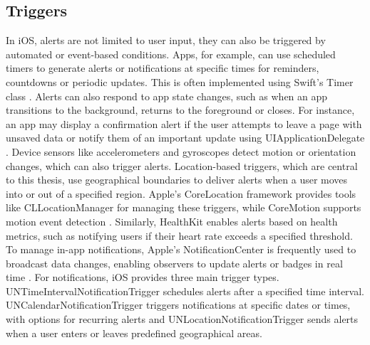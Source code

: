 \subsection{Triggers}
In iOS, alerts are not limited to user input, they can also be triggered by automated or event-based conditions. 
Apps, for example, can use scheduled timers to generate alerts or notifications at specific times for reminders, countdowns or periodic updates. 
This is often implemented using Swift's Timer class \cite{apple_timer}.
Alerts can also respond to app state changes, such as when an app transitions to the background, returns to the foreground or closes. 
For instance, an app may display a confirmation alert if the user attempts to leave a page with unsaved data or notify them of an important update using UIApplicationDelegate \cite{apple_app_delegate}.
Device sensors like accelerometers and gyroscopes detect motion or orientation changes, which can also trigger alerts.
Location-based triggers, which are central to this thesis, use geographical boundaries to deliver alerts when a user moves into or out of a specified region.
Apple's CoreLocation framework provides tools like CLLocationManager for managing these triggers, while CoreMotion supports motion event detection \cite{apple_corelocation, apple_coremotion}. 
Similarly, HealthKit \cite{apple_healthkit} enables alerts based on health metrics, such as notifying users if their heart rate exceeds a specified threshold.
To manage in-app notifications, Apple's NotificationCenter is frequently used to broadcast data changes, enabling observers to update alerts or badges in real time \cite{apple_notificationcenter}. 
For notifications, iOS provides three main trigger types. 
UNTimeIntervalNotificationTrigger \cite{apple_time_trigger} schedules alerts after a specified time interval. 
UNCalendarNotificationTrigger \cite{apple_calender_trigger} triggers notifications at specific dates or times, with options for recurring alerts and UNLocationNotificationTrigger \cite{apple_location_trigger} sends alerts when a user enters or leaves predefined geographical areas.


